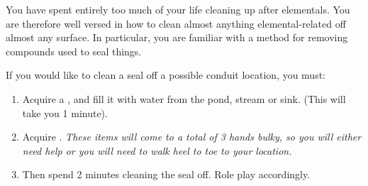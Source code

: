 \documentclass[green]{elementals}
\begin{document}
\name{\gUnsealConduit{}} 

You have spent entirely too much of your life cleaning up after elementals. You are therefore well versed in how to clean almost anything elemental-related off almost any surface. In particular, you are familiar with a method for removing compounds used to seal things. 

If you would like to clean a seal off a possible conduit location, you must: 
\begin{enumerate}
\item Acquire a \iBowl{}, and fill it with water from the pond, stream or sink. (This will take you 1 minute).
\item Acquire \iLye{}. \emph{These items will come to a total of 3 hands bulky, so you will either need help or you will need to  walk heel to toe to your location.} 
\item Then spend 2 minutes cleaning the seal off. Role play accordingly.
\end{enumerate}
\end{document}
